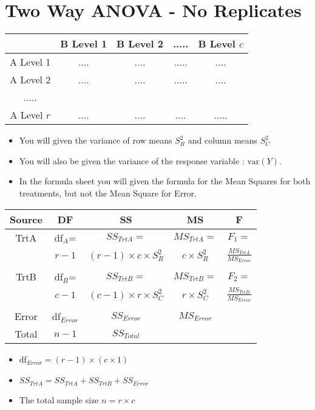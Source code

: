 \documentclass[]{article}
\begin{document}
\LARGE
\section*{Two Way ANOVA -  No Replicates}
\begin{center}
\begin{tabular}{|c|c|c|c|c|}
	\hline  & B Level 1 & B Level 2 & ..... & B Level $c$ \\ 
	\hline A Level 1 & .... & .... & ..... & .... \\ 
	\hline A Level 2 & .... & .... & ..... & .... \\ 
	\hline ..... & \phantom{spacesp} & \phantom{spacesp} & \phantom{spacesp} & \phantom{spacesp}\\ 
	\hline A Level $r$ & .... & .... & .... & ..... \\ 
	\hline 
\end{tabular} 
\end{center}

\begin{itemize}
	\item You will given the variance of row means $S^2_R$ and column means $S^2_C$
	\item You will also be given the variance of the response variable : $\textrm{var}(Y)$.
 \item In the formula sheet you will given the formula for the Mean Squares for both treatments, but not the Mean Square for Error.
\end{itemize}

\begin{center}
\begin{tabular}{|c|c|c|c|c|}
	\hline Source & DF & SS & MS & F \\ 
	\hline TrtA & df$_{A}$= & $SS_{TrtA} = $ & $MS_{TrtA} = $ &  $F_1 = $\\ 
  &  $r-1$ & $(r-1) \times c \times S^2_R$ & $c \times S^2_R$  & $ \displaystyle{\frac{MS_{TrtA} }{MS_{Error}} }$ \\ \phantom{spaces}&\phantom{spaces} &\phantom{spaces}&\phantom{spaces}& \phantom{spacesp}
  \\
	\hline TrtB & df$_{B}$=  & $SS_{TrtB} = $ & $MS_{TrtB}=$& $F_2 = $ \\ 
		 & $c-1$  & $(c-1) \times r \times S^2_C$ &   $ r \times S^2_C$ & $ \displaystyle{\frac{MS_{TrtB} }{MS_{Error}} }$ \\ &&&& 
		 \\
	\hline Error & df$_{Error}$ & $SS_{Error}$ & $MS_{Error}$  &  \\ 
	\hline Total & $n-1$ & $SS_{Total} $ &  &  \\ 
\hline 
\end{tabular} 
\end{center}

\bigskip

\begin{itemize}
	\item df$_{Error} = (r-1)\times (c \times 1)$
	\item $SS_{TrtA} = SS_{TrtA} + SS_{TrtB} + SS_{Error}$
	\item The total sample size $n=r \times c$
\end{itemize}
\end{document}
